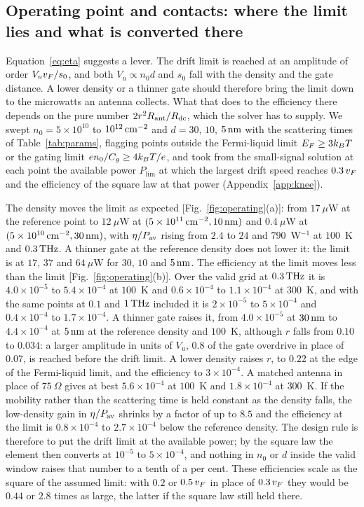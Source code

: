 \subsection{Operating point and contacts: where the limit lies and what is converted there}
\label{sec:operating}

Equation~\eqref{eq:eta} suggests a lever. The drift limit is reached at an
amplitude of order
$V_{u}v_{F}/s_{0}$, and both $V_{u}\propto n_{0}d$ and $s_{0}$ fall with the
density and the gate distance. A lower density or a thinner gate should
therefore bring the limit down to the microwatts an
antenna collects. What that does to the efficiency there depends on the
pure number $2r^{2}R_{\mathrm{ant}}/R_{\mathrm{dc}}$, which the solver has to supply. We swept
$n_{0}=5\times10^{10}$ to $10^{12}\,\mathrm{cm^{-2}}$ and $d=30$, $10$, $5\,\mathrm{nm}$ with the
scattering times of Table~\ref{tab:params}, flagging points outside the
Fermi-liquid limit $E_{F}\geq3k_{B} T$ or the gating limit
$e n_{0}/C_{g}\geq4k_{B} T/e$, and took from the small-signal solution at
each point the available power $P_{\mathrm{lim}}$ at which the largest
drift speed reaches $0.3\,v_{F}$ and the efficiency of the square law at
that power (Appendix~\ref{app:knee}).

The density moves the limit as expected [Fig.~\ref{fig:operating}(a)]: from
$17\ \mu$W at the reference point to $12\ \mu$W at
$(5\times10^{11}\,\mathrm{cm^{-2}},10\,\mathrm{nm})$ and $0.4\ \mu$W at $(5\times10^{10}\,\mathrm{cm^{-2}},30\,\mathrm{nm})$,
with $\eta/P_{\mathrm{av}}$ rising from $2.4$ to $24$ and $790$~W$^{-1}$ at $100$~K
and $0.3\,\mathrm{THz}$. A thinner gate at the reference density does not lower it:
the limit is at $17$, $37$ and $64\ \mu$W for $30$, $10$ and $5\,\mathrm{nm}$. The
efficiency at the limit moves less than the limit
[Fig.~\ref{fig:operating}(b)]. Over the
valid grid at $0.3\,\mathrm{THz}$ it is $4.0\times10^{-5}$ to
$5.4\times10^{-4}$ at $100$~K and $0.6\times10^{-4}$ to $1.1\times10^{-4}$ at
$300$~K, and with the same points at $0.1$ and $1\,\mathrm{THz}$ included it is
$2\times10^{-5}$ to $5\times10^{-4}$ and $0.4\times10^{-4}$ to
$1.7\times10^{-4}$. A thinner gate raises it, from $4.0\times10^{-5}$ at $30\,\mathrm{nm}$ to
$4.4\times10^{-4}$ at $5\,\mathrm{nm}$ at the reference density and $100$~K, although
$r$ falls from $0.10$ to $0.034$: a larger amplitude in units of $V_{u}$,
$0.8$ of the gate overdrive in place of $0.07$, is reached before the drift
limit. A lower density raises $r$, to $0.22$ at the edge of the
Fermi-liquid limit, and the efficiency to $3\times10^{-4}$. A matched
antenna in place of $75\ \Omega$ gives at
best $5.6\times10^{-4}$ at $100$~K and $1.8\times10^{-4}$ at $300$~K. If the mobility rather
than the scattering time is held constant as the density falls, the
low-density gain in $\eta/P_{\mathrm{av}}$ shrinks by a factor of up to $8.5$ and the
efficiency at the limit is $0.8\times10^{-4}$ to $2.7\times10^{-4}$ below
the reference density. The design rule is
therefore to put the drift limit at the available power; by the square
law the element then converts
at $10^{-5}$ to $5\times10^{-4}$, and nothing in $n_{0}$ or $d$ inside the
valid window raises that number to a tenth of a per cent. These
efficiencies scale as the square of the assumed limit: with $0.2$ or
$0.5\,v_{F}$ in place of $0.3\,v_{F}$ they
would be $0.44$ or $2.8$ times as large, the latter if the square law
still held there.

